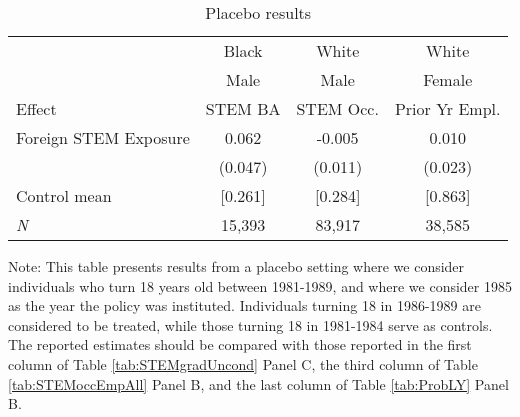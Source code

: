 \begin{table}[ht]
\caption{Placebo results}
\label{tab:ta00}
\centering
\begin{threeparttable}
\begin{tabular}{lccc}
\toprule 
       & Black           & White        & White       \\
       & Male            & Male         & Female      \\
Effect & STEM BA         & STEM Occ.    & Prior Yr Empl.\\
\midrule 
Foreign STEM Exposure & 0.062  & -0.005  & 0.010  \\ 
 &  (0.047)        & (0.011)        & (0.023) \\ 
Control mean &  [0.261]           & [0.284]         & [0.863] \\ 
\emph{N} &     15,393          &    83,917          &    38,585 \\ 
\bottomrule 
\end{tabular} 
\footnotesize Note: This table presents results from a placebo setting where we consider individuals who turn 18 years old between 1981-1989, and where we consider 1985 as the year the policy was instituted. Individuals turning 18 in 1986-1989 are considered to be treated, while those turning 18 in 1981-1984 serve as controls. The reported estimates should be compared with those reported in the first column of Table \ref{tab:STEMgradUncond} Panel C, the third column of Table \ref{tab:STEMoccEmpAll} Panel B, and the last column of Table \ref{tab:ProbLY} Panel B.
\end{threeparttable} 
\end{table} 

